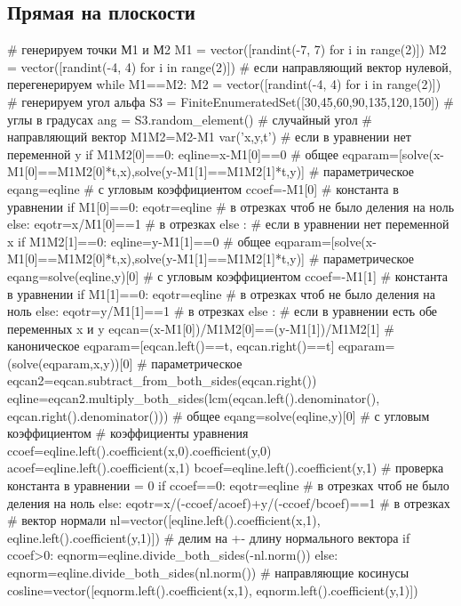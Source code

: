 \documentclass[a4paper, 12pt]{article}
\begin{document}
\subsection*{Прямая на плоскости}
\begin{sagesilent}
# генерируем точки М1 и М2
M1 = vector([randint(-7, 7) for i in range(2)])
M2 = vector([randint(-4, 4) for i in range(2)])
# если направляющий вектор нулевой, перегенерируем
while M1==M2:
 M2 = vector([randint(-4, 4) for i in range(2)]) 
# генерируем угол альфа
S3 = FiniteEnumeratedSet([30,45,60,90,135,120,150]) # углы в градусах
ang = S3.random_element() # случайный угол
# направляющий вектор
M1M2=M2-M1
var('x,y,t')
# если в уравнении нет переменной y
if M1M2[0]==0:
   eqline=x-M1[0]==0 # общее
   eqparam=[solve(x-M1[0]==M1M2[0]*t,x),solve(y-M1[1]==M1M2[1]*t,y)] # параметрическое
   eqang=eqline # с угловым коэффициентом
   ccoef=-M1[0] # константа в уравнении
   if M1[0]==0:
     eqotr=eqline # в отрезках чтоб не было деления на ноль
   else:
     eqotr=x/M1[0]==1 # в отрезках
else :
   # если в уравнении нет переменной x
   if M1M2[1]==0:
      eqline=y-M1[1]==0 # общее
      eqparam=[solve(x-M1[0]==M1M2[0]*t,x),solve(y-M1[1]==M1M2[1]*t,y)] # параметрическое
      eqang=solve(eqline,y)[0] # с угловым коэффициентом
      ccoef=-M1[1] # константа в уравнении
      if M1[1]==0:
        eqotr=eqline  # в отрезках чтоб не было деления на ноль
      else:
        eqotr=y/M1[1]==1 # в отрезках
   else :
      # если в уравнении есть обе переменных x и y
      eqcan=(x-M1[0])/M1M2[0]==(y-M1[1])/M1M2[1] # каноническое
      eqparam=[eqcan.left()==t, eqcan.right()==t]
      eqparam=(solve(eqparam,x,y))[0] # параметрическое
      eqcan2=eqcan.subtract_from_both_sides(eqcan.right())
      eqline=eqcan2.multiply_both_sides(lcm(eqcan.left().denominator(), eqcan.right().denominator())) # общее
      eqang=solve(eqline,y)[0] # с угловым коэффициентом
      # коэффициенты уравнения
      ccoef=eqline.left().coefficient(x,0).coefficient(y,0)
      acoef=eqline.left().coefficient(x,1)
      bcoef=eqline.left().coefficient(y,1)
      # проверка константа в уравнении = 0
      if ccoef==0:
         eqotr=eqline # в отрезках чтоб не было деления на ноль
      else:
         eqotr=x/(-ccoef/acoef)+y/(-ccoef/bcoef)==1 # в отрезках
# вектор нормали
nl=vector([eqline.left().coefficient(x,1), eqline.left().coefficient(y,1)])
# делим на +- длину нормального вектора
if ccoef>0:
   eqnorm=eqline.divide_both_sides(-nl.norm())
else:
   eqnorm=eqline.divide_both_sides(nl.norm())
#  направляющие косинусы 
cosline=vector([eqnorm.left().coefficient(x,1), eqnorm.left().coefficient(y,1)])

\end{sagesilent}
\end{document}

